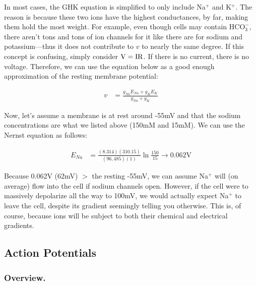 \documentclass[12pt]{report}
\newcommand{\V}{{\rm V}}
\begin{document}
In most cases, the GHK equation is simplified to only include Na$^+$ and K$^+$. The reason is because these two ions have the highest conductances, by far, making them hold the most weight. For example, even though cells may contain $\mathrm{HCO}_3^-$, there aren't tons and tons of ion channels for it like there are for sodium and potassium---thus it does not contribute to $v$ to nearly the same degree. If this concept is confusing, simply consider $\V = \mathrm{IR}$. If there is no current, there is no voltage. Therefore, we can use the equation below as a good enough approximation of the resting membrane potential:

\begin{equation} \label{GHK2}
\begin{split}
v &= \frac{g_{Na}E_{Na} + g_{K}E_{K}}{g_{Na} + g_{K}}
\end{split}
\end{equation}

Now, let's assume a membrane is at rest around -55mV and that the sodium concentrations are what we listed above (150mM and 15mM). We can use the Nernst equation as follows: 

\begin{equation} \label{Nernst1}
\begin{split}
E_{Na} &= \frac{(8.314)(310.15)}{(96,485)(1)}\ln\frac{150}{15} \rightarrow 0.062\mathrm{V}
\end{split}
\end{equation}

Because 0.062V (62mV) $>$ the resting -55mV, we can assume Na$^+$ will (on average) flow into the cell if sodium channels open. However, if the cell were to massively depolarize all the way to 100mV, we would actually expect Na$^+$ to leave the cell, despite its gradient seemingly telling you otherwise. This is, of course, because ions will be subject to both their chemical and electrical gradients. 

\subsection{Action Potentials}

\subsubsection{Overview.}
\end{document}
